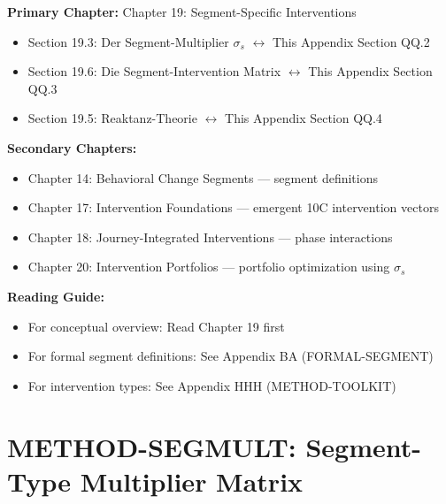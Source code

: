 \begin{tcolorbox}[colback=purple!5!white, colframe=purple!75!black,
    title=Chapter Linkage]

\textbf{Primary Chapter:} Chapter 19: Segment-Specific Interventions
\begin{itemize}[nosep]
\item Section 19.3: Der Segment-Multiplier $\sigma_s$ $\leftrightarrow$ This Appendix Section QQ.2
\item Section 19.6: Die Segment-Intervention Matrix $\leftrightarrow$ This Appendix Section QQ.3
\item Section 19.5: Reaktanz-Theorie $\leftrightarrow$ This Appendix Section QQ.4
\end{itemize}

\textbf{Secondary Chapters:}
\begin{itemize}[nosep]
\item Chapter 14: Behavioral Change Segments --- segment definitions
\item Chapter 17: Intervention Foundations --- emergent 10C intervention vectors
\item Chapter 18: Journey-Integrated Interventions --- phase interactions
\item Chapter 20: Intervention Portfolios --- portfolio optimization using $\sigma_s$
\end{itemize}

\textbf{Reading Guide:}
\begin{itemize}[nosep]
\item For conceptual overview: Read Chapter 19 first
\item For formal segment definitions: See Appendix BA (FORMAL-SEGMENT)
\item For intervention types: See Appendix HHH (METHOD-TOOLKIT)
\end{itemize}

\end{tcolorbox}


\chapter{METHOD-SEGMULT: Segment-Type Multiplier Matrix}
\label{app:segmult}


